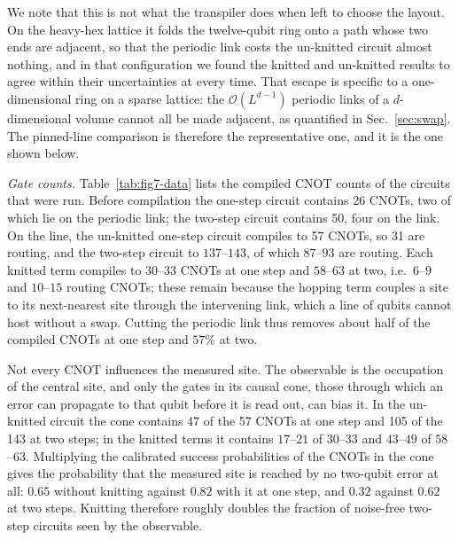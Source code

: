 We note that this is not what the transpiler does when left to choose the
layout.  On the heavy-hex lattice it folds the twelve-qubit ring onto a path
whose two ends are adjacent, so that the periodic link costs the un-knitted
circuit almost nothing, and in that configuration we found the knitted and
un-knitted results to agree within their uncertainties at every time.  That
escape is specific to a one-dimensional ring on a sparse lattice: the
$\mathcal{O}(L^{d-1})$ periodic links of a $d$-dimensional volume cannot all
be made adjacent, as quantified in Sec.~\ref{sec:swap}.  The pinned-line
comparison is therefore the representative one, and it is the one shown
below.

\noindent\textit{Gate counts.}\quad
Table~\ref{tab:fig7-data} lists the compiled CNOT counts of the circuits
that were run.  Before compilation the one-step circuit contains 26 CNOTs,
two of which lie on the periodic link; the two-step circuit contains 50, four
on the link.  On the line, the un-knitted one-step circuit compiles to 57
CNOTs, so 31 are routing, and the two-step circuit to $137$--$143$, of which
$87$--$93$ are routing.  Each knitted term compiles to $30$--$33$ CNOTs at one
step and $58$--$63$ at two, i.e.\ $6$--$9$ and $10$--$15$ routing CNOTs; these
remain because the hopping term couples a site to its next-nearest site
through the intervening link, which a line of qubits cannot host without a
swap.  Cutting the periodic link thus removes about half of the compiled
CNOTs at one step and $57\%$ at two.

Not every CNOT influences the measured site.  The observable is the
occupation of the central site, and only the gates in its causal cone, those
through which an error can propagate to that qubit before it is read out, can
bias it.  In the un-knitted circuit the cone contains 47 of the 57 CNOTs at
one step and 105 of the 143 at two steps; in the knitted terms it contains
$17$--$21$ of $30$--$33$ and $43$--$49$ of $58$--$63$.  Multiplying the
calibrated success probabilities of the CNOTs in the cone gives the
probability that the measured site is reached by no two-qubit error at all:
$0.65$ without knitting against $0.82$ with it at one step, and $0.32$ against
$0.62$ at two steps.  Knitting therefore roughly doubles the fraction of
noise-free two-step circuits seen by the observable.


